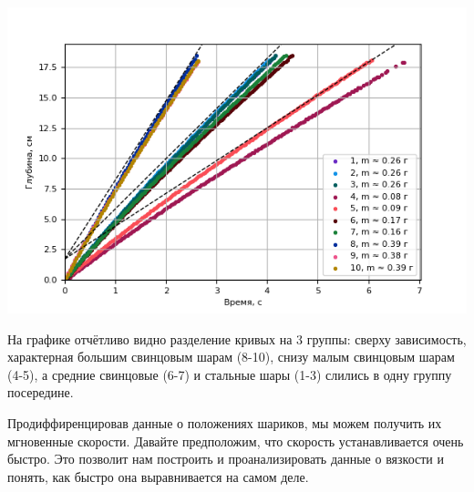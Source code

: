 \documentclass[a4paper, 12pt]{article}
\begin{document}
    \includegraphics{position-time.png}

    На графике отчётливо видно разделение кривых на 3 группы: сверху зависимость,
    характерная большим свинцовым шарам (8-10), снизу малым свинцовым шарам (4-5),
    а средние свинцовые (6-7) и стальные шары (1-3) слились в одну группу посередине.

    Продиффиренцировав данные о положениях шариков, мы можем получить их мгновенные скорости.
    Давайте предположим, что скорость устанавливается очень быстро.
    Это позволит нам построить и проанализировать данные о вязкости и понять,
    как быстро она выравнивается на самом деле.


%
%
\end{document}
